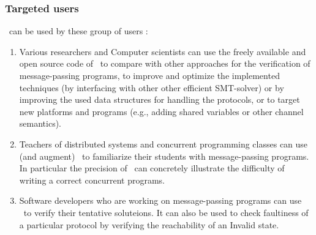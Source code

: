 \subsubsection{Targeted users}
\MPass\ can be used by these group of users :
%
\begin{enumerate}
\item Various researchers and Computer scientists can use the freely available and open source 
  code of \MPass\ to compare with other approaches for the verification of message-passing programs, to improve and optimize the implemented techniques (by interfacing with other  other efficient SMT-solver) or by improving the used data structures for handling the protocols, or to target new platforms and programs (e.g., adding shared variables or  other channel semantics).
  
  
  
  
%  
  
\item Teachers of distributed  systems  and concurrent programming classes can use (and augment) \MPass\ 
  to familiarize their students with message-passing programs.  In particular the precision of \MPass\ can concretely illustrate the difficulty of writing a correct concurrent programs.
  
%  
\item Software developers who are working on message-passing programs can use \MPass\   to verify their tentative soluteions.
  It can also be used to check faultiness of a particular protocol by verifying the reachability of an Invalid state.
\end{enumerate}